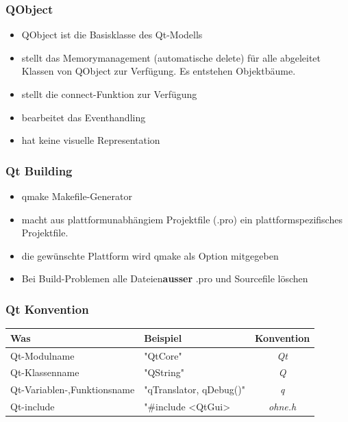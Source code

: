 \begin{multicols}{2}
	\subsubsection{QObject}
	\begin{itemize}
		\item QObject ist die Basisklasse des Qt-Modells
		\item stellt das Memorymanagement (automatische delete) für alle abgeleitet Klassen von QObject zur Verfügung. Es entstehen Objektbäume. 
		\item stellt die connect-Funktion zur Verfügung
		\item bearbeitet das Eventhandling
		\item hat keine visuelle Representation
	\end{itemize}
	
	\subsubsection{Qt Building}
	\begin{itemize}
		\item qmake Makefile-Generator
		\item macht aus plattformunabhängiem Projektfile (.pro) ein plattformspezifisches Projektfile. 
		\item die gewünschte Plattform wird qmake als Option mitgegeben
		\item Bei Build-Problemen alle Dateien\textbf{ausser} .pro und Sourcefile \newline löschen
	\end{itemize}
\end{multicols}

\subsubsection{Qt Konvention}
\begin{tabular}{|l|l|c|}
	\hline \textbf{Was}&
    \textbf{Beispiel} &
    \textbf{Konvention}
    \\ \hline
    
    Qt-Modulname&
    "QtCore"&
    \textit{Qt}
    \\ \hline
    
    Qt-Klassenname &
    "QString" &
    \textit{Q}
    \\ \hline
    
    Qt-Variablen-,Funktionsname &
    "qTranslator, qDebug()"&
    \textit{q}
    \\ \hline
    
    Qt-include &
    "\#include <QtGui>&
    \textit{ohne.h}
    \\ \hline
\end{tabular}

